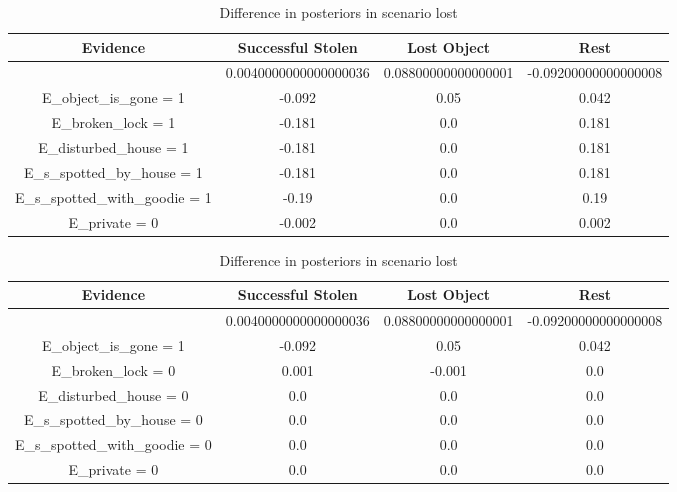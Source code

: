 \begin{table}\begin{tabular}{c|c|c|c}Evidence & Successful Stolen & Lost Object & Rest \\\hline & 0.0040000000000000036 & 0.08800000000000001 & -0.09200000000000008 \\E\_object\_is\_gone = 1 & -0.092 & 0.05 & 0.042 \\E\_broken\_lock = 1 & -0.181 & 0.0 & 0.181 \\E\_disturbed\_house = 1 & -0.181 & 0.0 & 0.181 \\E\_s\_spotted\_by\_house = 1 & -0.181 & 0.0 & 0.181 \\E\_s\_spotted\_with\_goodie = 1 & -0.19 & 0.0 & 0.19 \\E\_private = 0 & -0.002 & 0.0 & 0.002 \\\end{tabular}\caption{Difference in posteriors in scenario stolen }\begin{tabular}{c|c|c|c}Evidence & Successful Stolen & Lost Object & Rest \\\hline & 0.0040000000000000036 & 0.08800000000000001 & -0.09200000000000008 \\E\_object\_is\_gone = 1 & -0.092 & 0.05 & 0.042 \\E\_broken\_lock = 0 & 0.001 & -0.001 & 0.0 \\E\_disturbed\_house = 0 & 0.0 & 0.0 & 0.0 \\E\_s\_spotted\_by\_house = 0 & 0.0 & 0.0 & 0.0 \\E\_s\_spotted\_with\_goodie = 0 & 0.0 & 0.0 & 0.0 \\E\_private = 0 & 0.0 & 0.0 & 0.0 \\\end{tabular}\caption{Difference in posteriors in scenario lost }\end{table}